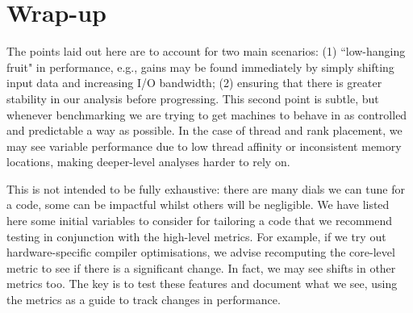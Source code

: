 \section{Wrap-up}
\label{section:tailoring:wrap-up}

The points laid out here are to account for two main scenarios: (1)
``low-hanging fruit" in performance, e.g., gains may be found immediately by
simply shifting input data and increasing I/O bandwidth; (2) ensuring that
there is greater stability in our analysis before progressing. This second
point is subtle, but whenever benchmarking we are trying to get machines to
behave in as controlled and predictable a way as possible. In the case of
thread and rank placement, we may see variable performance due to low thread
affinity or inconsistent memory locations, making deeper-level analyses harder
to rely on. 

This is not intended to be fully exhaustive: there are many dials we can tune
for a code, some can be impactful whilst others will be negligible. We have
listed here some initial variables to consider for tailoring a code that we
recommend testing in conjunction with the high-level metrics. For example, if
we try out hardware-specific compiler optimisations, we advise recomputing the
core-level metric to see if there is a significant change. In fact, we may see
shifts in other metrics too. The key is to test these features and document what we
see, using the metrics as a guide to track changes in performance.
